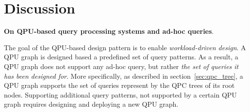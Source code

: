 
\section{Discussion}

\textbf{On QPU-based query processing systems and ad-hoc queries}.

\noindent
The goal of the QPU-based design pattern is to enable \textit{workload-driven design}.
A QPU graph is designed based a predefined set of query patterns.
As a result, a QPU graph does not support any ad-hoc query,
but rather \textit{the set of queries it has been designed for}.
More specifically, as described in section~\ref{sec:qpc_tree}, a QPU graph supports the set of queries represent by the QPC trees of its root nodes.
Supporting additional query patterns, not supported by a certain QPU graph requires designing and deploying a
new QPU graph.







